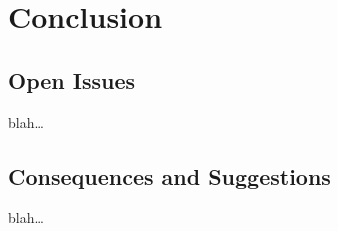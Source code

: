 \chapter{Conclusion}


\section{Open Issues}
blah\dots


\section{Consequences and Suggestions}
blah\dots

